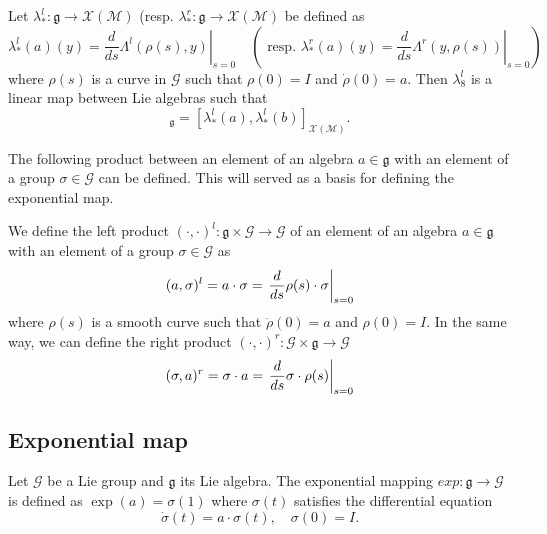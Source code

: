 \begin{lemma}
  Let $\lambda^l_{*} : \mathfrak g \rightarrow \mathcal X(\mathcal M) $ (resp. $\lambda^r_{*} : \mathfrak g \rightarrow \mathcal X(\mathcal M) $ be defined as
  \begin{equation}
  \lambda^l_{*}(a)(y) = \left.\frac{d}{ds}{ \Lambda^l (\rho(s), y)}\right|_{s=0} \quad (\text{ resp. }  \lambda^r_{*}(a)(y) = \left.\frac{d}{ds}{ \Lambda^r (y, \rho(s))}\right|_{s=0})\label{eq:26}  
\end{equation}
 where $\rho(s)$ is a curve in $\mathcal G$ such that $\rho(0)=I$ and $\dot\rho (0)=a$. Then $\lambda^l_{8}$ is a linear
map between Lie algebras such that
\begin{equation}
  [a, b]_{\mathfrak g} = [\lambda^l_{*}(a), \lambda^l_{*}(b)]_{\mathcal X(\mathcal M)}.\label{eq:27}
\end{equation}
\end{lemma}


The following product between an element of an algebra $a \in \mathfrak g$ with an element of a group $\sigma  \in \mathcal G$ 
 can be defined. This will served as a basis for defining the exponential map.
\begin{definition}
  We define the left product $(\cdot, \cdot)^l : \mathfrak g \times \mathcal G \rightarrow  \mathcal G$ of an element of an algebra $a \in \mathfrak g$ with an element of a group $\sigma  \in \mathcal G$ as
  \begin{equation}
 (a, \sigma)^l = a \cdot \sigma = \left.\frac{d}{ds} \rho(s) \cdot \sigma \right|_{s=0}\label{eq:28}
\end{equation}
where $\rho(s)$ is a smooth curve such that $\dot\rho(0)=a$ and $\rho(0)=I$. In the same way, we can define the right product $(\cdot, \cdot)^r : \mathcal G \times \mathfrak g  \rightarrow   \mathcal G$ 
\begin{equation}
  \label{eq:29}
  (\sigma,a)^r = \sigma \cdot a  = \left.\frac{d}{ds} \sigma \cdot \rho(s)   \right|_{s=0}
\end{equation}
\end{definition}

\subsection{Exponential map}
\begin{definition}
  Let $\mathcal G$ be a Lie group and $\mathfrak g$ its Lie algebra. The exponential mapping $exp : \mathfrak g \rightarrow \mathcal G$ is defined as $\exp(a) = \sigma(1)$ where $\sigma (t)$ satisfies the  differential equation
\begin{equation}
\dot \sigma(t) = a \cdot \sigma(t), \quad \sigma (0) = I.\label{eq:30}
\end{equation}
\end{definition}

